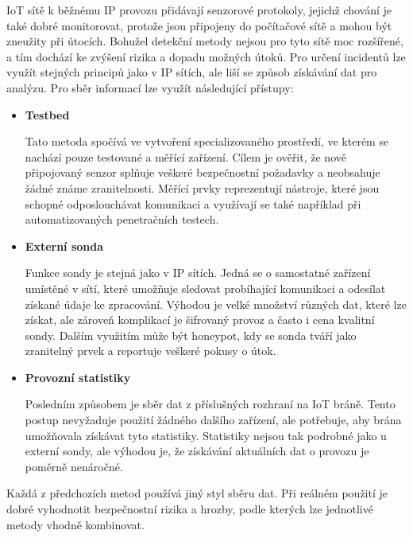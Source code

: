  IoT sítě k běžnému IP provozu přidávají senzorové protokoly, jejichž chování je také dobré monitorovat, 
 protože jsou připojeny do počítačové sítě a mohou být zneužity při útocích. Bohužel detekční metody 
 nejsou pro tyto sítě moc rozšířené, a tím dochází ke zvýšení rizika a dopadu možných útoků. Pro určení 
 incidentů lze využít stejných principů jako v IP sítích, ale liší se způsob získávání dat pro analýzu. 
 Pro sběr informací lze využít následující přístupy:
 \begin{itemize}
  \item \textbf{Testbed}
  
    Tato metoda spočívá ve vytvoření specializovaného prostředí, ve kterém se nachází pouze testované 
    a měřící zařízení. Cílem je ověřit, že nově připojovaný senzor splňuje veškeré bezpečnostní 
    požadavky a neobsahuje žádné známe zranitelnosti. Měřící prvky reprezentují nástroje, které 
    jsou schopné odposlouchávat komunikaci a využívají se také například při automatizovaných
    penetračních testech.   
  \item \textbf{Externí sonda}
  
  Funkce sondy je stejná jako v IP sítích. Jedná se o samostatné zařízení umístěné v sítí, které
  umožňuje sledovat probíhající komunikaci a odesílat získané údaje ke zpracování. 
  Výhodou je velké množství různých  dat, které lze získat, ale zároveň komplikací je šifrovaný provoz
  a často i cena kvalitní sondy.
  Dalším využitím 
  může být honeypot, kdy se sonda tváří jako zranitelný prvek a reportuje veškeré pokusy o útok.
    
  \item \textbf{Provozní statistiky}
  
  Posledním způsobem je sběr dat z příslušných rozhraní na IoT bráně. Tento postup nevyžaduje použití
  žádného dalšího zařízení, ale potřebuje, aby brána umožňovala získávat tyto statistiky. 
  Statistiky nejsou tak podrobné jako u externí sondy, ale výhodou je, 
  že získávání aktuálních dat o provozu je poměrně nenáročné.
 \end{itemize}
 
 Každá z předchozích metod používá jiný styl sběru dat. Při reálném použití je dobré vyhodnotit 
 bezpečnostní rizika a hrozby, podle kterých lze jednotlivé metody vhodně kombinovat.

 \newpage
